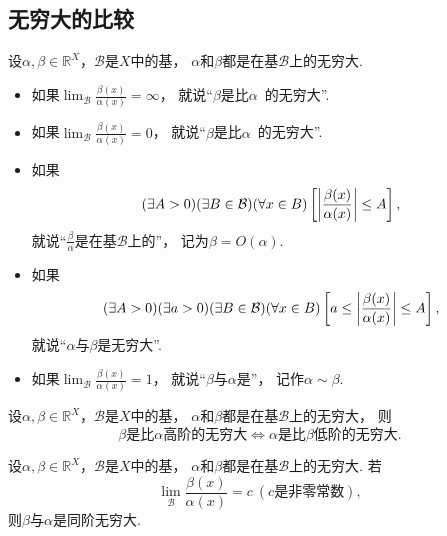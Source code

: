\subsection{无穷大的比较}
\begin{definition}
设\(\alpha,\beta\in\mathbb{R}^X\)，\(\mathcal{B}\)是\(X\)中的基，
\(\alpha\)和\(\beta\)都是在基\(\mathcal{B}\)上的无穷大.
\newcommand{\lf}[1][]{\lim_\mathcal{B} \frac{\beta(x)}{\alpha^{#1}(x)}}
\begin{itemize}
	\item 如果\(\lf=\infty\)，
	就说“\(\beta\)是比\(\alpha\)~的无穷大”.

	\item 如果\(\lf=0\)，
	就说“\(\beta\)是比\(\alpha\)~的无穷大”.

	\item 如果\[
		(\exists A>0)
		(\exists B\in\mathcal{B})
		(\forall x\in B)
		\left[
			\abs{\frac{\beta(x)}{\alpha(x)}} \leq A
		\right],
	\]
	就说“\(\frac\beta\alpha\)是在基\(\mathcal{B}\)上的”，
	记为\(\beta = O(\alpha)\).

	\item 如果\[
		(\exists A>0)
		(\exists a>0)
		(\exists B\in\mathcal{B})
		(\forall x\in B)
		\left[
			a \leq \abs{\frac{\beta(x)}{\alpha(x)}} \leq A
		\right],
	\]
	就说“\(\alpha\)与\(\beta\)是无穷大”.

	\item 如果\(\lf=1\)，
	就说“\(\beta\)与\(\alpha\)是”，
	记作\(\alpha\sim\beta\).
\end{itemize}
\end{definition}

\begin{proposition}
设\(\alpha,\beta\in\mathbb{R}^X\)，\(\mathcal{B}\)是\(X\)中的基，
\(\alpha\)和\(\beta\)都是在基\(\mathcal{B}\)上的无穷大，
则\[
	\text{\(\beta\)是比\(\alpha\)高阶的无穷大}
	\iff
	\text{\(\alpha\)是比\(\beta\)低阶的无穷大}.
\]
\end{proposition}

\begin{proposition}
设\(\alpha,\beta\in\mathbb{R}^X\)，\(\mathcal{B}\)是\(X\)中的基，
\(\alpha\)和\(\beta\)都是在基\(\mathcal{B}\)上的无穷大.
若\[
	\lim_\mathcal{B} \frac{\beta(x)}{\alpha(x)} = c\ (\text{$c$是非零常数}),
\]
则\(\beta\)与\(\alpha\)是同阶无穷大.
\end{proposition}

